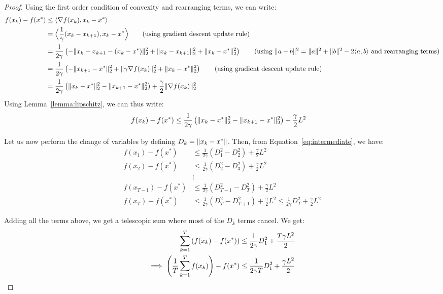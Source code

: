\documentclass{article}
\DeclarePairedDelimiter{\norm}{\lVert}{\rVert}
\DeclarePairedDelimiter{\inprod}{\langle}{\rangle}
\DeclarePairedDelimiter{\Biginprod}{\Big\langle}{\Big\rangle}
\begin{document}
\begin{proof}
Using the first order condition of convexity and rearranging terms, we can write:
\begin{align*}
f(x_k)-f(x^\ast) &\leq \inprod{\nabla f(x_k), x_k-x^\ast}\\
&= \Biginprod{\frac{1}{\gamma}(x_k-x_{k+1}), x_k-x^\ast} \tag{using gradient descent update rule}\\
&= \frac{1}{2\gamma} \left(-\norm{x_k-x_{k+1}-(x_k-x^\ast)}_2^2 + \norm{x_k-x_{k+1}}_2^2 + \norm{x_k-x^\ast}_2^2\right) \tag{using $\norm{a-b}^2 = \norm{a}^2+\norm{b}^2-2\inprod{a,b}$ and rearranging terms}\\
&= \frac{1}{2\gamma} \left(-\norm{x_{k+1}-x^\ast}_2^2 + \norm{\gamma\nabla f(x_k)}_2^2 + \norm{x_k-x^\ast}_2^2\right) \tag{using gradient descent update rule}\\
&= \frac{1}{2\gamma} \left(\norm{x_k-x^\ast}_2^2-\norm{x_{k+1}-x^\ast}_2^2\right) + \frac{\gamma}{2}\norm{\nabla f(x_k)}_2^2
\end{align*}
Using Lemma~\ref{lemma:lipschitz}, we can thus write:
\begin{align}
f(x_k)-f(x^\ast) &\leq \frac{1}{2\gamma} \left(\norm{x_k-x^\ast}_2^2-\norm{x_{k+1}-x^\ast}_2^2\right) + \frac{\gamma}{2}L^2 \label{eq:intermediate}
\end{align}

Let us now perform the change of variables by defining $D_k = \norm{x_k-x^\ast}$. Then, from Equation~\ref{eq:intermediate}, we have:
\begin{align*}
f(x_1) - f(x^\ast) &\leq \frac{1}{2\gamma} \left(D_1^2 - D_2^2\right) + \frac{\gamma}{2}L^2\\
f(x_2) - f(x^\ast) &\leq \frac{1}{2\gamma} \left(D_2^2 - D_3^2\right) + \frac{\gamma}{2}L^2\\
&\vdots\\
f(x_{T-1}) - f(x^\ast) &\leq \frac{1}{2\gamma} \left(D_{T-1}^2 - D_T^2\right) + \frac{\gamma}{2}L^2\\
f(x_T) - f(x^\ast) &\leq \frac{1}{2\gamma} \left(D_T^2 - D_{T+1}^2\right) + \frac{\gamma}{2}L^2 \leq \frac{1}{2\gamma} D_T^2 + \frac{\gamma}{2}L^2
\end{align*}

Adding all the terms above, we get a telescopic sum where most of the $D_k$ terms cancel. We get:
\begin{align}
\sum_{k=1}^T \left(f(x_k)-f(x^\ast)\right) &\leq \frac{1}{2\gamma} D_1^2 + \frac{T\gamma L^2}{2}\notag\\
\implies \left(\frac{1}{T}\sum_{k=1}^T f(x_k)\right)-f(x^\ast) &\leq \frac{1}{2\gamma T} D_1^2 + \frac{\gamma L^2}{2}\label{eq:intermediate2}
\end{align}


\end{proof}
\end{document}
